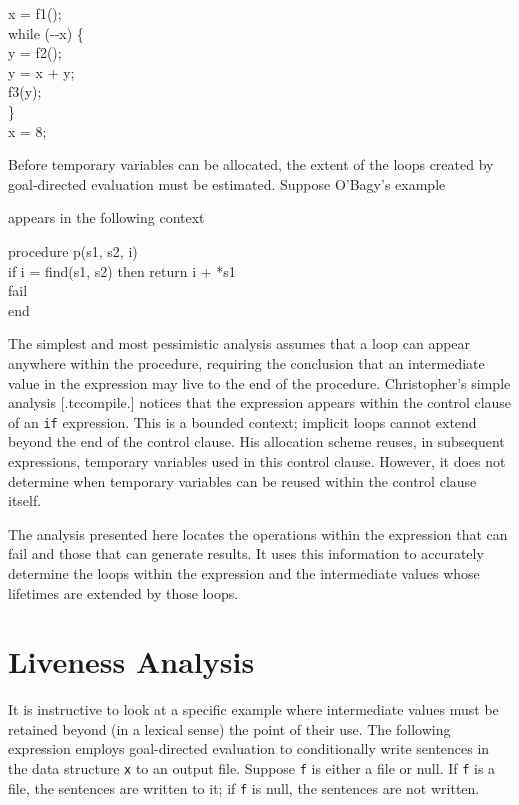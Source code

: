 \goodbreak
\begin{iconcode}
x = f1();\\
while (-{}-x) \{\\
\>y = f2();\\
\>y = x + y;\\
\>f3(y);\\
\>\}\\
x = 8;\\
\end{iconcode}

Before temporary variables can be allocated, the extent of the loops
created by goal-directed evaluation must be estimated. Suppose
O'Bagy's example


\noindent
appears in the following context 

\goodbreak
\begin{iconcode}
procedure p(s1, s2, i)\\
\>if i = find(s1, s2) then return i + *s1\\
\>fail\\
end\\
\end{iconcode}

The simplest and most pessimistic analysis assumes that a loop can
appear anywhere within the procedure, requiring the conclusion that an
intermediate value in the expression may live to the end of the
procedure. Christopher's simple analysis [.tccompile.] notices that
the expression appears within the control clause of an \texttt{if}
expression. This is a bounded context; implicit loops cannot extend
beyond the end of the control clause. His allocation scheme reuses, in
subsequent expressions, temporary variables used in this control
clause. However, it does not determine when temporary variables can be
reused within the control clause itself.

The analysis presented here locates the operations within the
expression that can fail and those that can generate results. It uses
this information to accurately determine the loops within the
expression and the intermediate values whose lifetimes are extended by
those loops.


\section{Liveness Analysis}

It is instructive to look at a specific example where intermediate
values must be retained beyond (in a lexical sense) the point of their
use. The following expression employs goal-directed evaluation to
conditionally write sentences in the data structure \texttt{x} to an output
file. Suppose \texttt{f} is either a file or null. If \texttt{f} is a file, the
sentences are written to it; if \texttt{f} is null, the sentences are not
written.

